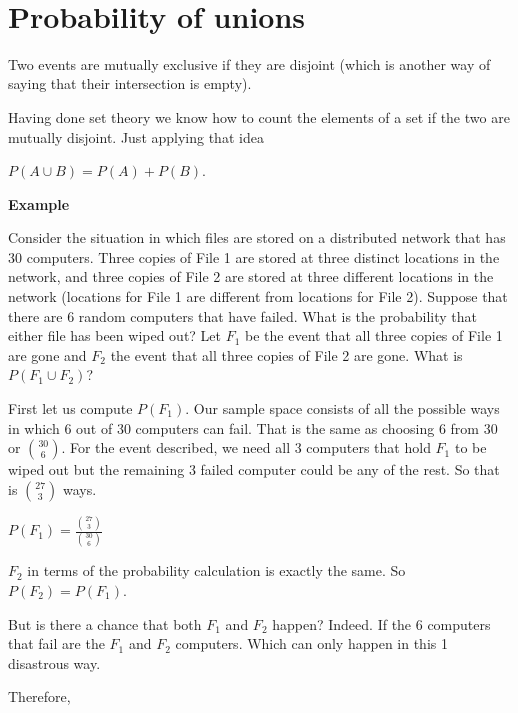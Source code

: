 \documentclass[12pt]{article}
\begin{document}
\begin{center}
\\
\vspace{1cm}
\end{center}

\vspace{0.5cm}\noindent

\section*{Probability of unions}
Two events are mutually exclusive if they are disjoint (which is another way of saying that their intersection is empty).

Having done set theory we know how to count the elements of a set if the two are mutually disjoint. 
Just applying that idea

$P(A \cup B) = P(A) + P(B)$.

\medskip

\textbf{Example}

Consider the situation in which files are stored on a distributed network that has 30 computers. Three copies of File 1 are stored at three distinct locations in the network, and three copies of File 2 are stored at three different locations in the network (locations for File 1 are different from locations for File 2). Suppose that there are 6 random computers that have failed. What is the probability that either file has been wiped out? Let $F_1$ be the event that all three copies of File 1 are gone and $F_2$ the event that all three copies of File 2 are gone. What is $P(F_1 \cup F_2)$?

First let us compute $P(F_1)$. Our sample space consists of all the possible ways in which 6 out of 30 computers can fail. That is the same as choosing 6 from 30 or $30 \choose 6$. For the event described, we need all 3 computers that hold $F_1$ to be wiped out but the remaining 3 failed computer could be any of the rest. So that is $27 \choose 3$ ways.

$P(F_1) = \frac{{27 \choose 3}}{{30 \choose 6}}$

$F_2$ in terms of the probability calculation is exactly the same. So $P(F_2) = P(F_1)$.

But is there a chance that both $F_1$ and $F_2$ happen? Indeed. If the 6 computers that fail are the $F_1$ and $F_2$ computers. Which can only happen in this 1 disastrous way.

Therefore,
\end{document}
